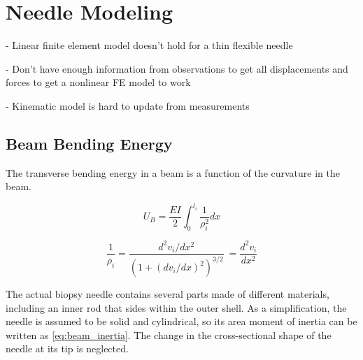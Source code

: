 %
%
%



\chapter{Needle Modeling}
\label{needlemodel} %

- Linear finite element model doesn't hold for a thin flexible needle

- Don't have enough information from observations to get all displacements and forces to get a nonlinear FE model to work

- Kinematic model is hard to update from measurements

\section{Beam Bending Energy}

The transverse bending energy in a beam is a function of the curvature in the beam.

\begin{equation}
\label{eq:bending_energy_transverse}
U_B = \frac{EI}{2}\int_{0}^{l_i}\frac{1}{\rho^2_i}dx
\end{equation}


\begin{equation}
\label{eq:curvature}
\frac{1}{\rho_i} = \frac{d^2v_i/dx^2}{(1+(dv_i/dx)^2)^{3/2}} ~= \frac{d^2v_i}{dx^2}
\end{equation}

The actual biopsy needle contains several parts made of different materials, including an inner rod that sides within the outer shell. As a simplification, the needle is assumed to be solid and cylindrical, so its area moment of inertia can be written as \ref{eq:beam_inertia}. The change in the cross-sectional shape of the needle at its tip is neglected.

